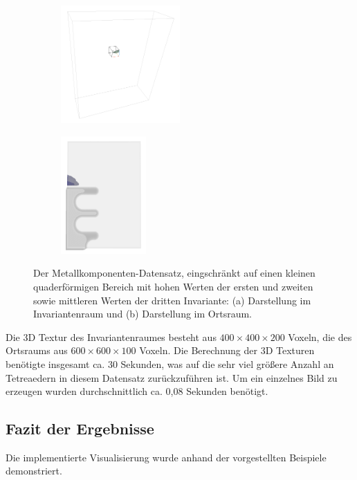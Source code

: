 \documentclass[a4paper,fontsize=12pt,toc=bib,parskip=half,ngerman]{scrartcl}
\begin{document}
\begin{figure}
	\begin{subfigure}{0.49\textwidth}
		\centering
		\includegraphics[height=4.5cm]{pictures/results/Nodel/Nodel_InvariantSpace1.png}
		\subcaption{}
		\label{NodelInvariant1}
	\end{subfigure}
	\hspace*{\fill}
	\begin{subfigure}{0.49\textwidth}
		\centering
		\includegraphics[height=4.5cm]{pictures/results/Nodel/Nodel_Object1.png}
		\subcaption{}
		\label{NodelObject1}
	\end{subfigure}
	\caption{Der Metallkomponenten-Datensatz, eingschr\"ankt auf einen kleinen quaderf\"ormigen Bereich mit hohen Werten der ersten und zweiten sowie mittleren Werten der dritten Invariante: (a) Darstellung im Invariantenraum und (b) Darstellung im Ortsraum.}
	\label{NodelInteractions}
\end{figure}

Die 3D Textur des Invariantenraumes besteht aus $400\times400\times200$ Voxeln, die des Ortsraums aus $600\times600\times100$ Voxeln. Die Berechnung der 3D Texturen ben\"otigte insgesamt ca. 30 Sekunden, was auf die sehr viel gr\"o{\ss}ere Anzahl an Tetreaedern in diesem Datensatz zur\"uckzuf\"uhren ist. Um ein einzelnes Bild zu erzeugen wurden durchschnittlich ca. 0,08 Sekunden ben\"otigt.

\subsection{Fazit der Ergebnisse}
Die implementierte Visualisierung wurde anhand der vorgestellten Beispiele demonstriert. 
\end{document}
